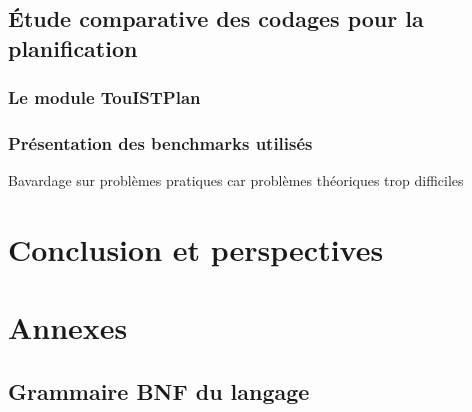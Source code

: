 \documentclass[a4paper,12pt,oneside,fullcap,chkrefs,webpdf64,m3L,cmr,mathcenter,noSciVerse,amsmath]{extbook}
\begin{document}
\section{Étude comparative des codages pour la planification}

\subsection{Le module TouISTPlan}


\subsection{Présentation des benchmarks utilisés}
Bavardage sur problèmes pratiques car problèmes théoriques trop difficiles









\chapter{Conclusion et perspectives}


\appendix
\chapter{Annexes}
\section{Grammaire BNF du langage \touist}


\printbibliography
\end{document}
